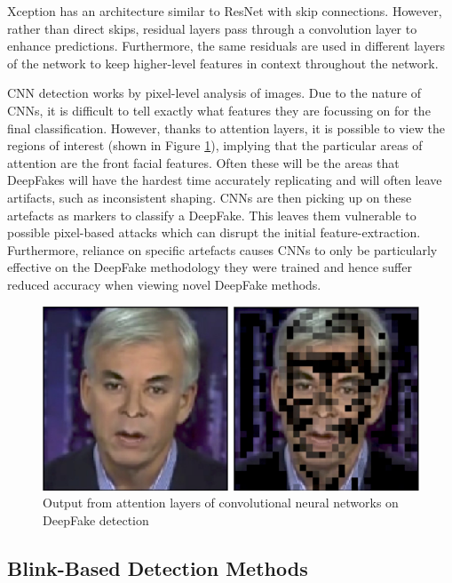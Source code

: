 Xception has an architecture similar to ResNet with skip connections. However, rather than direct skips, residual layers pass through a convolution layer to enhance predictions. Furthermore, the same residuals are used in different layers of the network to keep higher-level features in context throughout the network.

CNN detection works by pixel-level analysis of images. Due to the nature of CNNs, it is difficult to tell exactly what features they are focussing on for the final classification. However, thanks to attention layers, it is possible to view the regions of interest (shown in Figure \ref{fig:attention}), implying that the particular areas of attention are the front facial features. Often these will be the areas that DeepFakes will have the hardest time accurately replicating and will often leave artifacts, such as inconsistent shaping\cite{verdoliva2020media}. CNNs are then picking up on these artefacts as markers to classify a DeepFake. This leaves them vulnerable to possible pixel-based attacks which can disrupt the initial feature-extraction\cite{gandhi2020adversarial}. Furthermore, reliance on specific artefacts causes CNNs to only be particularly effective on the DeepFake methodology they were trained and hence suffer reduced accuracy when viewing novel DeepFake methods\cite{thing2023deepfake}.

\begin{figure}[H]
    \centering
    \includegraphics[width=0.5\linewidth]{dissertation//figures/attention-cnns.png}
    \caption{Output from attention layers of convolutional neural networks on DeepFake detection\cite{bonettini2021video}}
    \label{fig:attention}
\end{figure}

\subsection{Blink-Based Detection Methods}
\label{sec:blink-based-detection}


